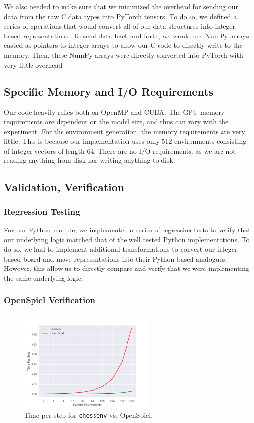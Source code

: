 \documentclass[12pt]{article}
\begin{document}
We also needed to make sure that we minimized the overhead for sending our data from the raw C data types into PyTorch tensors. To do so, we defined a series of operations that would convert all of our data structures into integer based representations. To send data back and forth, we would use NumPy arrays casted as pointers to integer arrays to allow our C code to directly write to the memory. Then, these NumPy arrays were directly converted into PyTorch with very little overhead.

\subsection{Specific Memory and I/O Requirements}

Our code heavily relies both on OpenMP and CUDA. The GPU memory requirements are dependent on the model size, and thus can vary with the experiment. For the environment generation, the memory requirements are very little. This is because our implementation uses only 512 environments consisting of integer vectors of length 64. There are no I/O requirements, as we are not reading anything from disk nor writing anything to disk.

\subsection{Validation, Verification} 

\subsubsection{Regression Testing}
For our Python module, we implemented a series of regression tests to verify that our underlying 
logic matched that of the well tested Python implementations. To do so, we had to implement additional transformations to convert our integer based board and move representations into their Python based analogues. However, this allow us to directly compare and verify that we were implementing the same underlying logic. 

\subsubsection{OpenSpiel Verification}\label{subsec:openspiel-verification}

\begin{figure}[H]
    \centering
    \includegraphics[width=0.6\textwidth]{plots/time_per_step.png}
    \caption{Time per step for \texttt{chessenv} vs. OpenSpiel.}
    \label{fig:time_per_step}
\end{figure}
\end{document}
